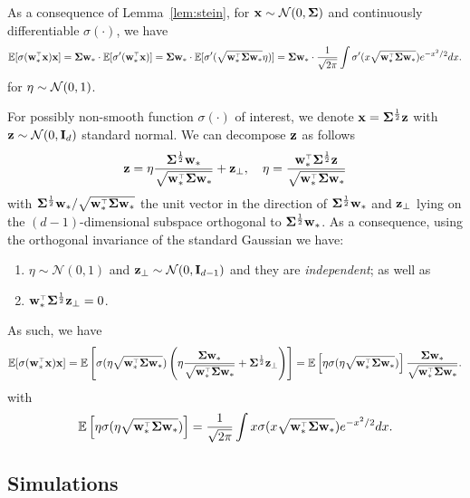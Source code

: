 \documentclass[11pt]{article}
\begin{document}
As a consequence of Lemma~\ref{lem:stein}, for $\mathbf x \sim \mathcal{N}(0, \mathbf{\Sigma})$ and continuously differentiable $\sigma (\cdot)$, we have
\[
  \E[\sigma(\w_*^\top \x) \x] = \Sigmab \w_* \cdot \E[\sigma'(\w_*^\top \x)] = \Sigmab \w_* \cdot \E[\sigma'(\sqrt{\w_*^\top \Sigmab \w_*} \eta)] = \Sigmab \w_* \cdot \frac1{\sqrt{2\pi}} \int \sigma'(x\sqrt{\w_*^\top \Sigmab \w_*}) e^{-x^2/2} dx.
\]
for $\eta \sim \mathcal{N}(0,1)$.



\bigskip

For possibly non-smooth function $\sigma(\cdot)$ of interest, we denote $\mathbf x = \mathbf{\Sigma}^{\frac12} \mathbf z$ with $\mathbf z \sim \mathcal{N}(0, \mathbf I_d)$ standard normal. We can decompose $\mathbf z$ as follows
\[
  \z = \eta \frac{\Sigmab^{\frac12} \w_*}{ \sqrt{\w_*^\top \Sigmab \w_*} } + \z_\perp, \quad \eta = \frac{\w_*^\top \Sigmab^{\frac12} \z}{ \sqrt{\w_*^\top \Sigmab \w_*} }
\]
with $\Sigmab^{\frac12} \w_*/\sqrt{\w_*^\top \Sigmab \w_*}$ the unit vector in the direction of $\mathbf{\Sigma}^{\frac12} \mathbf w_*$ and $\mathbf z_\perp$ lying on the $(d-1)$-dimensional subspace orthogonal to $\mathbf{\Sigma}^{\frac12} \mathbf w_*$. As a consequence, using the orthogonal invariance of the standard Gaussian we have:
\begin{enumerate}
  \item $\eta \sim \mathcal N(0,1)$ and $\mathbf z_\perp \sim \mathcal N(0,\mathbf I_{d-1})$ and they are \emph{independent}; as well as 
  \item $\w_*^\top \Sigmab^{\frac12} \z_\perp = 0$.
\end{enumerate}


As such, we have
\[
  \E[ \sigma(\w_*^\top \x) \x ] = \E \left[ \sigma(\eta \sqrt{\w_*^\top \Sigmab \w_*} ) \left( \eta \frac{\Sigmab \w_*}{ \sqrt{\w_*^\top \Sigmab \w_*} } + \Sigmab^{\frac12} \z_\perp \right) \right] = \E \left[ \eta \sigma(\eta \sqrt{\w_*^\top \Sigmab \w_*} ) \right] \frac{\Sigmab \w_*}{ \sqrt{\w_*^\top \Sigmab \w_*} }.
\]
with
\[
  \E \left[ \eta \sigma(\eta \sqrt{\w_*^\top \Sigmab \w_*} ) \right] = \frac1{\sqrt{2 \pi}} \int x \sigma(x \sqrt{\w_*^\top \Sigmab \w_*}) e^{-x^2/2} dx.
\]


\subsection{Simulations}
\end{document}
